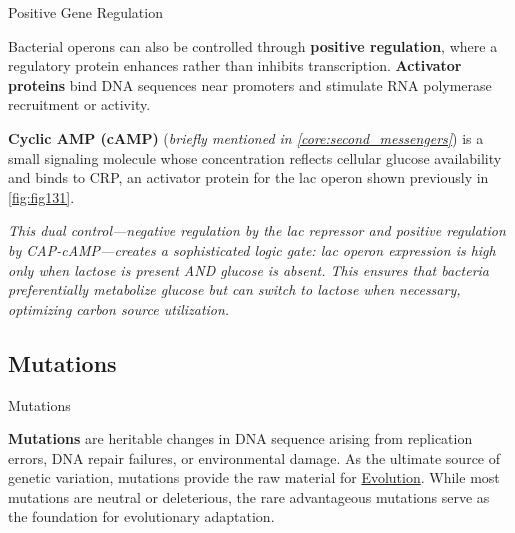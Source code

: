 \documentclass[10pt]{article}
\begin{document}
    \begin{core}{Positive Gene Regulation}
      
      Bacterial operons can also be controlled through \textbf{positive regulation}, where a regulatory protein enhances rather than inhibits transcription. \textbf{Activator proteins} bind DNA sequences near promoters and stimulate RNA polymerase recruitment or activity.
      
      \textbf{Cyclic AMP (cAMP)} (\textit{briefly mentioned in \autoref{core:second_messengers}}) is a small signaling molecule whose concentration reflects cellular glucose availability and binds to CRP, an activator protein for the lac operon shown previously in \autoref{fig:fig131}. 


      \textit{This dual control---negative regulation by the lac repressor and positive regulation by CAP-cAMP---creates a sophisticated logic gate: lac operon expression is high only when lactose is present AND glucose is absent. This ensures that bacteria preferentially metabolize glucose but can switch to lactose when necessary, optimizing carbon source utilization.}

    \end{core}  

  \subsection{Mutations}

  \begin{core}[label=core:mutations]{Mutations}

      \textbf{Mutations} are heritable changes in DNA sequence arising from replication errors, DNA repair failures, or environmental damage. As the ultimate source of genetic variation, mutations provide the raw material for \href{https://ibahng.github.io/biology/evolution/evolution.pdf}{Evolution}. While most mutations are neutral or deleterious, the rare advantageous mutations serve as the foundation for evolutionary adaptation.

    \end{core}
\end{document}
